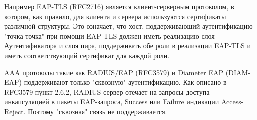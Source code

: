 Например EAP-TLS (RFC2716) является клиент-серверным протоколом, в котором, как правило, для клиента и сервера используются сертификаты различной структуры. Это означает, что хост, поддерживающий аутентификацию "точка-точка" при помощи EAP-TLS должен иметь реализацию слоя Аутентификатора и слоя пира, поддерживать обе роли в реализации EAP-TLS и иметь соответствующий сертификат для каждой роли.

AAA протоколы такие как RADIUS/EAP (RFC3579) и Diameter EAP (DIAM-EAP) поддерживают только "сквозную" аутентификацию. Как описано в RFC3579 пункт 2.6.2, RADIUS-сервер отечает на запросы доступа инкапсуляцией в пакеты EAP-запроса, Success или Failure индикации Access-Reject. Поэтому "сквозная" связь не поддерживается.



